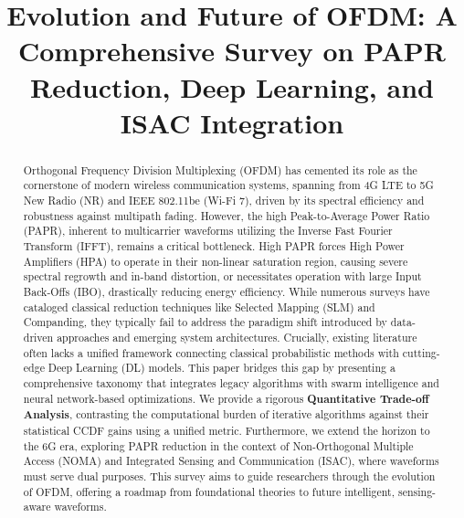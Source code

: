 \documentclass[conference]{IEEEtran}
\begin{document}
\title{Evolution and Future of OFDM: A Comprehensive Survey on PAPR Reduction, Deep Learning, and ISAC Integration}

\author{
}

\maketitle

\begin{abstract}
    Orthogonal Frequency Division Multiplexing (OFDM) has cemented its role as the cornerstone of modern wireless communication systems, spanning from 4G LTE to 5G New Radio (NR) and IEEE 802.11be (Wi-Fi 7), driven by its spectral efficiency and robustness against multipath fading. However, the high Peak-to-Average Power Ratio (PAPR), inherent to multicarrier waveforms utilizing the Inverse Fast Fourier Transform (IFFT), remains a critical bottleneck. High PAPR forces High Power Amplifiers (HPA) to operate in their non-linear saturation region, causing severe spectral regrowth and in-band distortion, or necessitates operation with large Input Back-Offs (IBO), drastically reducing energy efficiency. While numerous surveys have cataloged classical reduction techniques like Selected Mapping (SLM) and Companding, they typically fail to address the paradigm shift introduced by data-driven approaches and emerging system architectures. Crucially, existing literature often lacks a unified framework connecting classical probabilistic methods with cutting-edge Deep Learning (DL) models. This paper bridges this gap by presenting a comprehensive taxonomy that integrates legacy algorithms with swarm intelligence and neural network-based optimizations. We provide a rigorous \textbf{Quantitative Trade-off Analysis}, contrasting the computational burden of iterative algorithms against their statistical CCDF gains using a unified metric. Furthermore, we extend the horizon to the 6G era, exploring PAPR reduction in the context of Non-Orthogonal Multiple Access (NOMA) and Integrated Sensing and Communication (ISAC), where waveforms must serve dual purposes. This survey aims to guide researchers through the evolution of OFDM, offering a roadmap from foundational theories to future intelligent, sensing-aware waveforms.
\end{abstract}
\end{document}
